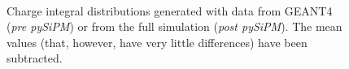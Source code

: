 \begin{figure}
	\centering
	 \\
	\caption{Charge integral distributions generated with data from GEANT4 (\textit{pre pySiPM}) or from the full simulation (\textit{post pySiPM}). The mean values (that, however, have very little differences) have been subtracted.}
	\label{fig:cfr_e_dist}
\end{figure}

